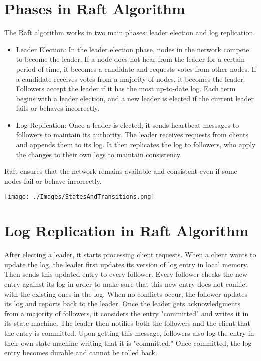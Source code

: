 \section{Phases in Raft Algorithm}
The Raft algorithm works in two main phases: leader election and log replication.
\begin{itemize}
    \item Leader Election: In the leader election phase, nodes in the network compete
        to become the leader. If a node does not hear from the leader for a
        certain period of time, it becomes a candidate and requests votes from other
        nodes. If a candidate receives votes from a majority of nodes, it becomes
        the leader. Followers accept the leader if it has the most up-to-date
        log. Each term begins with a leader election, and a new leader is
        elected if the current leader fails or behaves incorrectly.

    \item Log Replication: Once a leader is elected, it sends heartbeat messages
        to followers to maintain its authority. The leader receives requests
        from clients and appends them to its log. It then replicates the log to followers,
        who apply the changes to their own logs to maintain consistency.
\end{itemize}
Raft ensures that the network remains available and consistent even if some nodes
fail or behave incorrectly.
\begin{center}
    \texttt{[image: ./Images/StatesAndTransitions.png]}
\end{center}

\section{Log Replication in Raft Algorithm}

After electing a leader, it starts processing client requests. When a client
wants to update the log, the leader first updates its version of log entry in local
memory. Then sends this updated entry to every follower. Every follower checks the
new entry against its log in order to make sure that this new entry does not conflict
with the existing ones in the log. When no conflicts occur, the follower updates
its log and reports back to the leader. Once the leader gets acknowledgments
from a majority of followers, it considers the entry "committed" and writes it in
its state machine. The leader then notifies both the followers and the client
that the entry is committed. Upon getting this message, followers also log the
entry in their own state machine writing that it is "committed." Once committed,
the log entry becomes durable and cannot be rolled back.
